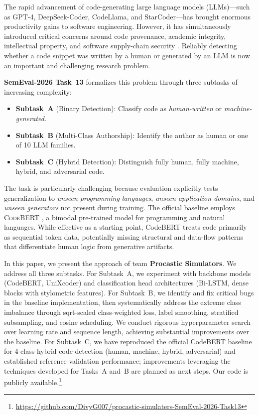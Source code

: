 \documentclass[11pt]{article}
\begin{document}
The rapid advancement of code-generating large language models (LLMs)---such as GPT-4, DeepSeek-Coder, CodeLlama, and StarCoder---has brought enormous productivity gains to software engineering. However, it has simultaneously introduced critical concerns around code provenance, academic integrity, intellectual property, and software supply-chain security \cite{orel2025droid}. Reliably detecting whether a code snippet was written by a human or generated by an LLM is now an important and challenging research problem.

\textbf{SemEval-2026 Task~13} \cite{orel-etal-2025-codet} formalizes this problem through three subtasks of increasing complexity:
\begin{itemize}
    \item \textbf{Subtask~A} (Binary Detection): Classify code as \textit{human-written} or \textit{machine-generated}.
    \item \textbf{Subtask~B} (Multi-Class Authorship): Identify the author as human or one of 10 LLM families.
    \item \textbf{Subtask~C} (Hybrid Detection): Distinguish fully human, fully machine, hybrid, and adversarial code.
\end{itemize}

The task is particularly challenging because evaluation explicitly tests generalization to \textit{unseen programming languages}, \textit{unseen application domains}, and \textit{unseen generators} not present during training. The official baseline employs \textsc{CodeBERT} \cite{feng-etal-2020-codebert}, a bimodal pre-trained model for programming and natural languages. While effective as a starting point, CodeBERT treats code primarily as sequential token data, potentially missing structural and data-flow patterns that differentiate human logic from generative artifacts.

In this paper, we present the approach of team \textbf{Procastic Simulators}. We address all three subtasks. For Subtask~A, we experiment with backbone models (CodeBERT, UniXcoder) and classification head architectures (Bi-LSTM, dense blocks with stylometric features). For Subtask~B, we identify and fix critical bugs in the baseline implementation, then systematically address the extreme class imbalance through sqrt-scaled class-weighted loss, label smoothing, stratified subsampling, and cosine scheduling. We conduct rigorous hyperparameter search over learning rate and sequence length, achieving substantial improvements over the baseline. For Subtask~C, we have reproduced the official CodeBERT baseline for 4-class hybrid code detection (human, machine, hybrid, adversarial) and established reference validation performance; improvements leveraging the techniques developed for Tasks~A and~B are planned as next steps. Our code is publicly available.\footnote{\url{https://github.com/DivyG007/procastic-simulaters-SemEval-2026-Task13}}
\end{document}
